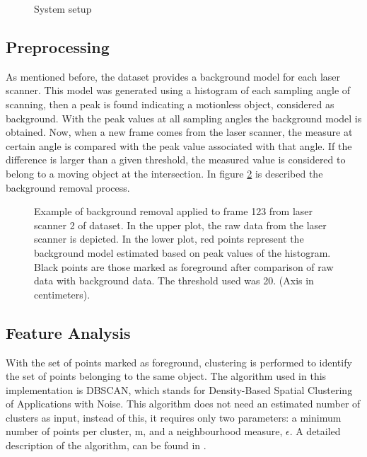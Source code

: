 \documentclass[10pt,twocolumn,letterpaper]{article}
\begin{document}
\begin{figure}[ht!]
\centering


\caption{System setup}
\label{inter_cfg}
\end{figure}
 
\subsection{Preprocessing}

As mentioned before, the dataset provides a background model for each laser scanner. This model was generated using a histogram of each sampling angle of scanning, then a peak is found indicating a motionless object, considered as background. With the peak values at all sampling angles the background model is obtained. Now, when a new frame comes from the laser scanner, the measure at certain angle is compared with the peak value associated with that angle. If the difference is larger than a given threshold, the measured value is considered to belong to a moving object at the intersection. In figure \ref{bg_proc} is described the background removal process.



\begin{figure}[ht!]
\centering


\caption{Example of background removal applied to frame 123 from laser scanner 2 of dataset. In the upper plot, the raw data from the laser scanner is depicted. In the lower plot, red points represent the background model estimated based on peak values of the histogram. Black points are those marked as foreground after comparison of raw data with background data. The threshold used was 20. (Axis in centimeters).}
\label{bg_proc}
\end{figure}


\subsection{Feature Analysis}

With the set of points marked as foreground, clustering is performed to identify the set of points belonging to the same object. The algorithm used in this implementation is DBSCAN, which stands for Density-Based Spatial Clustering of Applications with Noise. This algorithm does not need an estimated number of clusters as input, instead of this, it requires only two parameters: a minimum number of points per cluster, m, and a neighbourhood measure, $\epsilon$. A detailed description of the algorithm, can be found in \cite{Ester96}.
\end{document}
